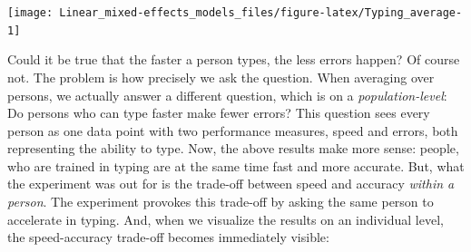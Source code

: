 \documentclass[]{svmono}
\newenvironment{Shaded}{\begin{snugshade}}{\end{snugshade}}
\newcommand{\KeywordTok}[1]{\textcolor[rgb]{0.13,0.29,0.53}{\textbf{#1}}}
\newcommand{\DataTypeTok}[1]{\textcolor[rgb]{0.13,0.29,0.53}{#1}}
\newcommand{\DecValTok}[1]{\textcolor[rgb]{0.00,0.00,0.81}{#1}}
\newcommand{\StringTok}[1]{\textcolor[rgb]{0.31,0.60,0.02}{#1}}
\newcommand{\OtherTok}[1]{\textcolor[rgb]{0.56,0.35,0.01}{#1}}
\newcommand{\OperatorTok}[1]{\textcolor[rgb]{0.81,0.36,0.00}{\textbf{#1}}}
\newcommand{\NormalTok}[1]{#1}
\begin{document}
\begin{Shaded}
\end{Shaded}

\texttt{[image: Linear\_mixed-effects\_models\_files/figure-latex/Typing\_average-1]}

Could it be true that the faster a person types, the less errors happen?
Of course not. The problem is how precisely we ask the question. When
averaging over persons, we actually answer a different question, which
is on a \emph{population-level}: Do persons who can type faster make
fewer errors? This question sees every person as one data point with two
performance measures, speed and errors, both representing the ability to
type. Now, the above results make more sense: people, who are trained in
typing are at the same time fast and more accurate. But, what the
experiment was out for is the trade-off between speed and accuracy
\emph{within a person}. The experiment provokes this trade-off by asking
the same person to accelerate in typing. And, when we visualize the
results on an individual level, the speed-accuracy trade-off becomes
immediately visible:

\begin{Shaded}
\end{Shaded}
\end{document}
